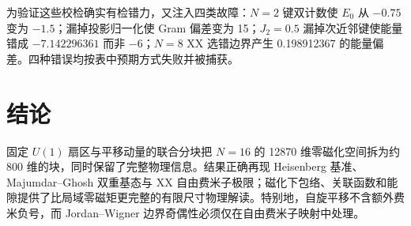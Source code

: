 \documentclass[11pt,a4paper]{ctexart}
\begin{document}
为验证这些校检确实有检错力，又注入四类故障：$N=2$ 键双计数使 $E_0$ 从 $-0.75$ 变为 $-1.5$；漏掉投影归一化使 Gram 偏差变为 15；$J_2=0.5$ 漏掉次近邻键使能量错成 $-7.142296361$ 而非 $-6$；$N=8$ XX 选错边界产生 0.198912367 的能量偏差。四种错误均按表中预期方式失败并被捕获。

\section{结论}
固定 $U(1)$ 扇区与平移动量的联合分块把 $N=16$ 的 12870 维零磁化空间拆为约 800 维的块，同时保留了完整物理信息。结果正确再现 Heisenberg 基准、Majumdar--Ghosh 双重基态与 XX 自由费米子极限；磁化下包络、关联函数和能隙提供了比局域零磁矩更完整的有限尺寸物理解读。特别地，自旋平移不含额外费米负号，而 Jordan--Wigner 边界奇偶性必须仅在自由费米子映射中处理。
\end{document}
